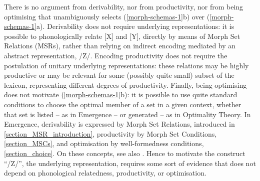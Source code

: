 There is no argument from derivability, nor from productivity, nor from being optimising that unambiguously selects (\ref{morph-schemas-1}b) over (\ref{morph-schemas-1}a). Derivability  does not require underlying representations: it is possible to phonologically relate [X] and [Y],  directly by means of Morph Set Relations (MSRs), rather than relying on indirect encoding  mediated by an abstract representation, /Z/. Encoding productivity does not require the postulation of unitary underlying representations: these relations may be highly productive or may be relevant for some (possibly quite small) subset of the lexicon, representing different degrees of productivity.  Finally, being optimising does not motivate (\ref{morph-schemas-1}b): it is possible to use quite standard conditions to choose the optimal member of a  set in a given context, whether that set is listed -- as in Emergence -- or generated -- as in Optimality Theory. In Emergence, derivability is expressed by Morph Set Relations, introduced  in \Sec\ref{section_MSR_introduction}, productivity by Morph Set Conditions, \Sec\ref{section_MSCs}, and optimisation by well-formedness conditions, \Sec\ref{section_choice}. On these concepts, see also  \citet{Archangeli+:2012Korea, Archangeli+:2015_Frontiers, Archangeli+:2015_K-tone, Archangeli+:2015_YVH, Archangeli+:2016mm, Archangeli+:2017-Setswana, Archangeli+:2018routledge}. Hence to motivate the construct ``/Z/'', the underlying representation, requires some sort of evidence that does not depend on phonological relatedness, productivity, or optimisation. 

